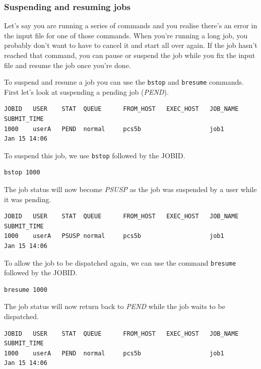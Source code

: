 \documentclass[11pt]{article}
\begin{document}
    \subsubsection{Suspending and resuming
jobs}\label{suspending-and-resuming-jobs}

Let's say you are running a series of commands and you realise there's
an error in the input file for one of those commands. When you're
running a long job, you probably don't want to have to cancel it and
start all over again. If the job hasn't reached that command, you can
pause or suspend the job while you fix the input file and resume the job
once you're done.

To suspend and resume a job you can use the \texttt{bstop} and
\texttt{bresume} commands. First let's look at suspending a pending job
(\textit{PEND}).

\begin{verbatim}
JOBID   USER    STAT  QUEUE      FROM_HOST   EXEC_HOST   JOB_NAME   SUBMIT_TIME
1000    userA   PEND  normal     pcs5b                   job1       Jan 15 14:06
\end{verbatim}

    To suspend this job, we use \texttt{bstop} followed by the JOBID.

    \begin{verbatim}
bstop 1000
\end{verbatim}

    The job status will now become \textit{PSUSP} as the job was suspended by
a user while it was pending.

    \begin{verbatim}
JOBID   USER    STAT  QUEUE      FROM_HOST   EXEC_HOST   JOB_NAME   SUBMIT_TIME
1000    userA   PSUSP normal     pcs5b                   job1       Jan 15 14:06
\end{verbatim}

    To allow the job to be dispatched again, we can use the command
\texttt{bresume} followed by the JOBID.

    \begin{verbatim}
bresume 1000
\end{verbatim}

    The job status will now return back to \textit{PEND} while the job waits
to be dispatched.

    \begin{verbatim}
JOBID   USER    STAT  QUEUE      FROM_HOST   EXEC_HOST   JOB_NAME   SUBMIT_TIME
1000    userA   PEND  normal     pcs5b                   job1       Jan 15 14:06
\end{verbatim}
\end{document}
